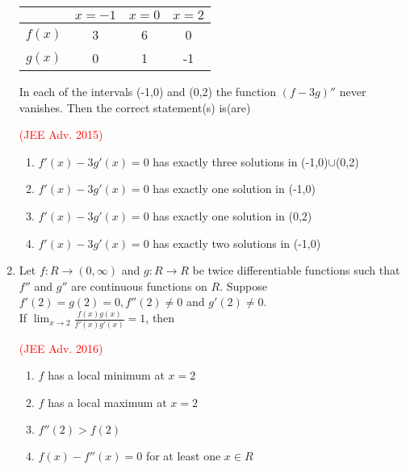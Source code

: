 \documentclass[journal,12pt,twocolumn]{IEEEtran}
\theoremstyle{remark}
\begin{document}
\begin{enumerate}[start = 7]
{\begin{flushleft}
\begin{center}
            \begin{tabular}{|c|c|c|c|} 
              \hline
               & $x=-1$ & $x = 0$ & $x = 2$ \\ 
              \hline
               $f(x)$& 3 & 6 & 0\\ 
              \hline
               $g(x)$ & 0 & 1 & -1\\ 
              \hline
            \end{tabular}
            \end{center}  
            In each of the intervals (-1,0) and (0,2) the function $(f-3g)''$ never vanishes. Then the correct statement(s) is(are)
            \begin{flushright}
                \textcolor{red}{(JEE Adv. 2015)}
            \end{flushright}
            \begin{enumerate}
                \item $f'(x) - 3g'(x) = 0$ has exactly three solutions in (-1,0)$\cup$(0,2)
                \item $f'(x) - 3g'(x) = 0$ has exactly one solution in (-1,0)
                \item $f'(x) - 3g'(x) = 0$ has exactly one solution in (0,2)
                \item $f'(x) - 3g'(x) = 0$ has exactly two solutions in (-1,0)
            \end{enumerate}
        \end{flushleft}
        }
    \item{
        \begin{flushleft}
            Let $f: R\rightarrow (0,\infty)$ and $g: R\rightarrow R$ be twice differentiable functions such that $f''$ and $g''$ are continuous functions on $R$. Suppose $f'(2) = g(2)=0, f''(2) \neq0$ and $g'(2)\neq0$.\\[6pt] If $\lim_{x\to2} \displaystyle \frac{f(x)g(x)}{f'(x)g'(x)} = 1$, then
            \begin{flushright}
                \textcolor{red}{(JEE Adv. 2016)}
            \end{flushright}
            \begin{enumerate}
                \item $f$ has a local minimum at $x=2$
                \item $f$ has a local maximum at $x=2$
                \item $f''(2)>f(2)$
                \item $f(x) - f''(x) = 0$ for at least one $x\in R$

\end{enumerate}
\end{flushleft}}
\end{enumerate}
\end{document}
